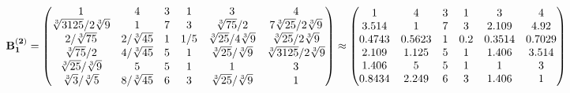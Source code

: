 \documentclass[10pt,a4paper]{article}
\begin{document}
	\[
		\bold{B_1^{(2)}} = 
		\begin{pmatrix}
			{1}{} & {{4}}{} & {{3}}{} & {1}{} & {{3}}{} & {{4}}{} \\
			{\sqrt[3]{3125}} / {{2}\sqrt[3]{9}} & {1}{} & {{7}}{} & {{3}}{} & {\sqrt[3]{75}} / {{2}} & {{7}\sqrt[3]{25}} / {{2}\sqrt[3]{9}} \\
			{{2}} / {\sqrt[3]{75}} & {{2}} / {\sqrt[3]{45}} & {1}{} & {1} / {{5}} & {\sqrt[3]{25}} / {{4}\sqrt[3]{9}} & {\sqrt[3]{25}} / {{2}\sqrt[3]{9}} \\
			{\sqrt[3]{75}} / {{2}} & {{4}} / {\sqrt[3]{45}} & {{5}}{} & {1}{} & {\sqrt[3]{25}} / {\sqrt[3]{9}} & {\sqrt[3]{3125}} / {{2}\sqrt[3]{9}} \\
			{\sqrt[3]{25}} / {\sqrt[3]{9}} & {{5}}{} & {{5}}{} & {1}{} & {1}{} & {{3}}{} \\
			{\sqrt[3]{3}} / {\sqrt[3]{5}} & {{8}} / {\sqrt[3]{45}} & {{6}}{} & {{3}}{} & {\sqrt[3]{25}} / {\sqrt[3]{9}} & {1}{} \\
		\end{pmatrix}
		\approx
		\begin{pmatrix}
			1        & 4        & 3        & 1        & 3        & 4        \\
			3.514    & 1        & 7        & 3        & 2.109    & 4.92     \\
			0.4743   & 0.5623   & 1        & 0.2      & 0.3514   & 0.7029   \\
			2.109    & 1.125    & 5        & 1        & 1.406    & 3.514    \\
			1.406    & 5        & 5        & 1        & 1        & 3        \\
			0.8434   & 2.249    & 6        & 3        & 1.406    & 1        \\
		\end{pmatrix}
	\]
\end{document}
